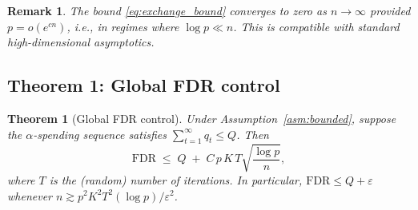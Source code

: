 \documentclass[11pt, a4paper]{article}
\newtheorem{theorem}{Theorem}
\newtheorem{remark}{Remark}
\newcommand{\FDR}{\mathrm{FDR}}
\begin{document}
\begin{remark}
The bound \eqref{eq:exchange_bound} converges to zero as
$n \to \infty$ provided $p = o(e^{cn})$, i.e., in regimes where $\log p \ll
n$.  This is compatible with standard high-dimensional asymptotics.
\end{remark}

\subsection{Theorem 1: Global FDR control}
\label{sec:fdr_proof}

\begin{theorem}[Global FDR control]
\label{thm:fdr}
Under Assumption~\ref{asm:bounded}, suppose the $\alpha$-spending sequence
satisfies $\sum_{t=1}^\infty q_t \leq Q$.  Then
\begin{equation}
  \FDR \;\leq\; Q
  \;+\;
  C\,p\,K\,T \sqrt{\frac{\log p}{n}},
  \label{eq:fdr_bound}
\end{equation}
where $T$ is the (random) number of iterations.  In particular,
$\FDR \leq Q + \varepsilon$ whenever $n \gtrsim p^2 K^2 T^2 (\log p)/\varepsilon^2$.
\end{theorem}
\end{document}
